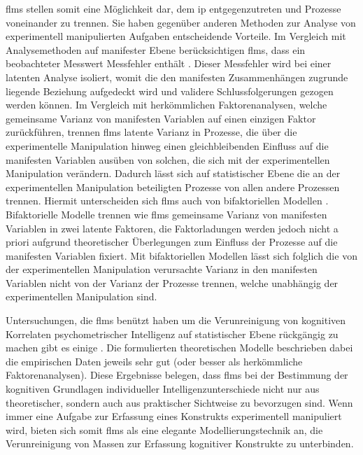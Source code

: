 \documentclass[11pt, twoside, a4paper]{book}		%
\begin{document}
\glspl{flm} stellen somit eine Möglichkeit dar, dem \gls{ip} entgegenzutreten und Prozesse voneinander zu trennen. Sie haben gegenüber anderen Methoden zur Analyse von experimentell manipulierten Aufgaben entscheidende Vorteile.
Im Vergleich mit Analysemethoden auf manifester Ebene berücksichtigen \glspl{flm}, dass ein beobachteter Messwert Messfehler enthält \citep{Moosbrugger2007}. Dieser Messfehler wird bei einer latenten Analyse isoliert, womit die den manifesten Zusammenhängen zugrunde liegende Beziehung aufgedeckt wird und validere Schlussfolgerungen gezogen werden können.
Im Vergleich mit herkömmlichen Faktorenanalysen, welche gemeinsame Varianz von manifesten Variablen auf einen einzigen Faktor zurückführen, trennen \glspl{flm} latente Varianz in Prozesse, die über die experimentelle Manipulation hinweg einen gleichbleibenden Einfluss auf die manifesten Variablen ausüben von solchen, die sich mit der experimentellen Manipulation verändern. Dadurch lässt sich auf statistischer Ebene die an der experimentellen Manipulation beteiligten Prozesse von allen andere Prozessen trennen.
Hiermit unterscheiden sich \glspl{flm} auch von bifaktoriellen Modellen \citep{Moosbrugger2006, Schweizer2010}. Bifaktorielle Modelle trennen wie \glspl{flm} gemeinsame Varianz von manifesten Variablen in zwei latente Faktoren, die Faktorladungen werden jedoch nicht a priori aufgrund theoretischer Überlegungen zum Einfluss der Prozesse auf die manifesten Variablen fixiert. Mit bifaktoriellen Modellen lässt sich folglich die von der experimentellen Manipulation verursachte Varianz in den manifesten Variablen nicht von der Varianz der Prozesse trennen, welche unabhängig der experimentellen Manipulation sind.

Untersuchungen, die \glspl{flm} benützt haben um die Verunreinigung von kognitiven Korrelaten psychometrischer Intelligenz auf statistischer Ebene rückgängig zu machen gibt es einige \citep[z. B.][]{Miller2010, Thomas2015, Troche2009e, Wagner2014, Pahud2017, Stauffer2014}. Die formulierten theoretischen Modelle beschrieben dabei die empirischen Daten jeweils sehr gut (oder besser als herkömmliche Faktorenanalysen). Diese Ergebnisse belegen, dass \glspl{flm} bei der Bestimmung der kognitiven Grundlagen individueller Intelligenzunterschiede nicht nur aus theoretischer, sondern auch aus praktischer Sichtweise zu bevorzugen sind. Wenn immer eine Aufgabe zur Erfassung eines Konstrukts experimentell manipuliert wird, bieten sich somit \glspl{flm} als eine elegante Modellierungstechnik an, die Verunreinigung von Massen zur Erfassung kognitiver Konstrukte zu unterbinden.
\end{document}
